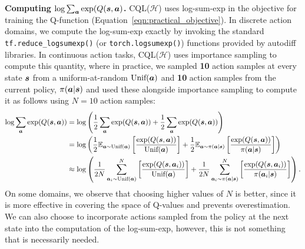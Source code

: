 \textbf{Computing $\log \sum_{\boldsymbol{a}} \exp(Q(\boldsymbol{s}, \boldsymbol{a})$.} CQL($\mathcal{H}$) uses log-sum-exp in the objective for training the Q-function (Equation~\ref{eqn:practical_objective}). In discrete action domains, we compute the log-sum-exp exactly by invoking the standard \texttt{tf.reduce\_logsumexp()} (or \texttt{torch.logsumexp()}) functions provided by autodiff libraries. In continuous action tasks, CQL($\mathcal{H}$) uses importance sampling to compute this quantity, where in practice, we sampled \textbf{10} action samples at every state $\boldsymbol{s}$ from a uniform-at-random $\text{Unif}(\boldsymbol{a})$ and \textbf{10} action samples from the current policy, $\pi(\boldsymbol{a}|\boldsymbol{s})$ and used these alongside importance sampling to compute it as follows using $N = 10$ action samples:
\begin{align*}
    \log \sum_{\boldsymbol{a}}\exp (Q(\boldsymbol{s}, \boldsymbol{a})) &= \log \left( \frac{1}{2}\sum_{\boldsymbol{a}} \exp (Q(\boldsymbol{s}, \boldsymbol{a})) + \frac{1}{2} \sum_{\boldsymbol{a}} \exp (Q(\boldsymbol{s}, \boldsymbol{a})) \right) \\
    &= \log \left( \frac{1}{2} \mathbb{E}_{\boldsymbol{a} \sim \text{Unif}(\boldsymbol{a})}\left[ \frac{\exp (Q(\boldsymbol{s}, \boldsymbol{a}))}{\text{Unif}(\boldsymbol{a})}\right] + \frac{1}{2} \mathbb{E}_{\boldsymbol{a} \sim \pi(\boldsymbol{a}|\boldsymbol{s})}\left[ \frac{\exp (Q(\boldsymbol{s}, \boldsymbol{a}))}{\pi(\boldsymbol{a}|\boldsymbol{s})}\right] \right) \\
    &\approx \log \left( \frac{1}{2N} \sum_{\boldsymbol{a}_i \sim \text{Unif}(\boldsymbol{a})}^N \left[ \frac{\exp (Q(\boldsymbol{s}, \boldsymbol{a}_i))}{\text{Unif}(\boldsymbol{a})}\right] + \frac{1}{2N} \sum_{\boldsymbol{a}_i \sim \pi(\boldsymbol{a}|\boldsymbol{s})}^N \left[ \frac{\exp (Q(\boldsymbol{s}, \boldsymbol{a}_i))}{\pi(\boldsymbol{a}_i|\boldsymbol{s})}\right] \right).
\end{align*}
On some domains, we observe that choosing higher values of $N$ is better, since it is more effective in covering the space of Q-values and prevents overestimation. We can also choose to incorporate actions sampled from the policy at the next state into the computation of the log-sum-exp, however, this is not something that is necessarily needed.


